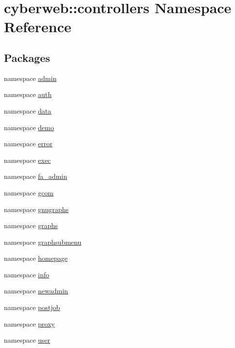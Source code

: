 \hypertarget{namespacecyberweb_1_1controllers}{\section{cyberweb\-:\-:controllers \-Namespace \-Reference}
\label{namespacecyberweb_1_1controllers}
}
\subsection*{\-Packages}
\begin{DoxyCompactItemize}
\item 
namespace \hyperlink{namespacecyberweb_1_1controllers_1_1admin}{admin}
\item 
namespace \hyperlink{namespacecyberweb_1_1controllers_1_1auth}{auth}
\item 
namespace \hyperlink{namespacecyberweb_1_1controllers_1_1data}{data}
\item 
namespace \hyperlink{namespacecyberweb_1_1controllers_1_1demo}{demo}
\item 
namespace \hyperlink{namespacecyberweb_1_1controllers_1_1error}{error}
\item 
namespace \hyperlink{namespacecyberweb_1_1controllers_1_1exec}{exec}
\item 
namespace \hyperlink{namespacecyberweb_1_1controllers_1_1fa__admin}{fa\-\_\-admin}
\item 
namespace \hyperlink{namespacecyberweb_1_1controllers_1_1gcom}{gcom}
\item 
namespace \hyperlink{namespacecyberweb_1_1controllers_1_1gnugraphs}{gnugraphs}
\item 
namespace \hyperlink{namespacecyberweb_1_1controllers_1_1graphs}{graphs}
\item 
namespace \hyperlink{namespacecyberweb_1_1controllers_1_1graphsubmenu}{graphsubmenu}
\item 
namespace \hyperlink{namespacecyberweb_1_1controllers_1_1homepage}{homepage}
\item 
namespace \hyperlink{namespacecyberweb_1_1controllers_1_1info}{info}
\item 
namespace \hyperlink{namespacecyberweb_1_1controllers_1_1newadmin}{newadmin}
\item 
namespace \hyperlink{namespacecyberweb_1_1controllers_1_1postjob}{postjob}
\item 
namespace \hyperlink{namespacecyberweb_1_1controllers_1_1proxy}{proxy}
\item 
namespace \hyperlink{namespacecyberweb_1_1controllers_1_1user}{user}
\end{DoxyCompactItemize}
